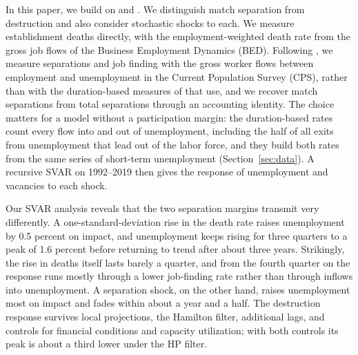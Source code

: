 \documentclass[authoryear, review, 12pt]{elsarticle}
\begin{document}
In this paper, we build on \citet{gabrovski_2025} and \citet{coles_2018}. We distinguish match separation from destruction and also consider stochastic shocks to each. We measure establishment deaths directly, with the employment-weighted death rate from the gross job flows of the Business Employment Dynamics (BED). Following \citet{fujita_2009}, we measure separations and job finding with the gross worker flows between employment and unemployment in the Current Population Survey (CPS), rather than with the duration-based measures of \citet{shimer_2005} that \citet{coles_2018} use, and we recover match separations from total separations through an accounting identity. The choice matters for a model without a participation margin: the duration-based rates count every flow into and out of unemployment, including the half of all exits from unemployment that lead out of the labor force, and they build both rates from the same series of short-term unemployment (Section~\ref{sec:data}). A recursive SVAR on 1992--2019 then gives the response of unemployment and vacancies to each shock.

Our SVAR analysis reveals that the two separation margins transmit very differently. A one-standard-deviation rise in the death rate raises unemployment by 0.5 percent on impact, and unemployment keeps rising for three quarters to a peak of 1.6 percent before returning to trend after about three years.
Strikingly, the rise in deaths itself lasts barely a quarter, and from the fourth quarter on the response runs mostly through a lower job-finding rate rather than through inflows into unemployment. A separation shock, on the other hand, raises unemployment most on impact and fades within about a year and a half.
The destruction response survives local projections, the Hamilton filter, additional lags, and controls for financial conditions and capacity utilization; with both controls its peak is about a third lower under the HP filter.
\end{document}
